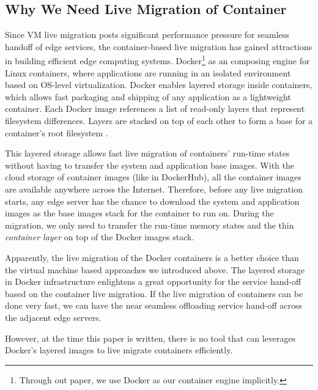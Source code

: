 \subsection{Why We Need Live Migration of Container}
Since VM live migration posts significant performance pressure for seamless handoff of edge services, the container-based live migration has gained attractions in building efficient edge computing systems. %
Docker\footnote{Through out paper, we use Docker as our container engine implicitly.} as an composing engine for Linux containers, where applications are running in an isolated environment based on OS-level virtualization. Docker enables layered storage inside containers, which allows fast packaging and shipping of any application as a lightweight container. Each Docker image references a list of read-only layers that represent filesystem differences. Layers are stacked on top of each other to form a base for a container’s root filesystem \cite{dockerlayer}. 

This layered storage allows fast live migration of containers' run-time states without having to transfer the system and application base images. With the cloud storage of container images (like in DockerHub), all the container images are available anywhere across the Internet. Therefore, before any live migration starts, any edge server has the chance to download the system and application images as the base images stack for the container to run on. 
During the migration, we only need to transfer the run-time memory states and the thin \textit{container layer} on top of the Docker images stack. 

Apparently, the live migration of the Docker containers is a better choice than the virtual machine based approaches we introduced above. The layered storage in Docker infrastructure enlightens a great opportunity for the service hand-off based on the container live migration. If the live migration of containers can be done very fast, we can have the near seamless offloading service hand-off across the adjacent edge servers.

However, at the time this paper is written, there is no tool that can leverages Docker's layered images to live migrate containers efficiently. 

